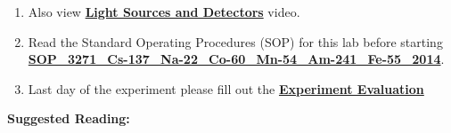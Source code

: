 \documentclass{../lab}
\begin{document}
\begin{enumerate}
    \item Also view \href{http://youtu.be/lQKLakISoBA}{\textbf{Light Sources and Detectors}} video.

    \item Read the Standard Operating Procedures (SOP) for this lab before starting \href{http://experimentationlab.berkeley.edu/sites/default/files/images/SOP\_3271\_Cs-137\_Na-22\_Co-60\_Mn-54\_Am-241\_Fe-55\_2014.pdf}{\textbf{SOP\_3271\_Cs-137\_Na-22\_Co-60\_Mn-54\_Am-241\_Fe-55\_2014}}.

    \item Last day of the experiment please fill out the \href{\ExperimentEvaluation}{\textbf{Experiment Evaluation}}

\end{enumerate}

\noindent\textbf{Suggested Reading:}
\end{document}

